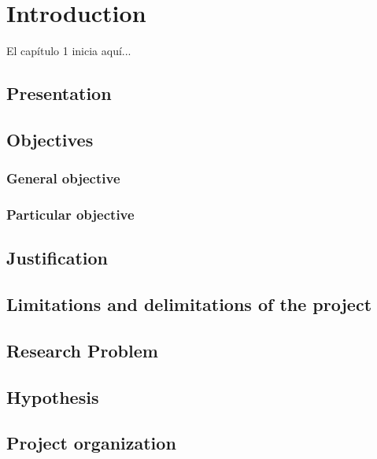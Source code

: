%
%
\let\textcircled=\pgftextcircled
\chapter{Introduction}
\label{Chapter1}


El cap\'itulo 1 inicia aqu\'i...

\section{Presentation}

\section{Objectives}

	\subsection{General objective}
	
	\subsection{Particular objective}
	
\section{Justification}

\section{Limitations and delimitations of the project}

\section{Research Problem}

\section{Hypothesis}

\section{Project organization}
